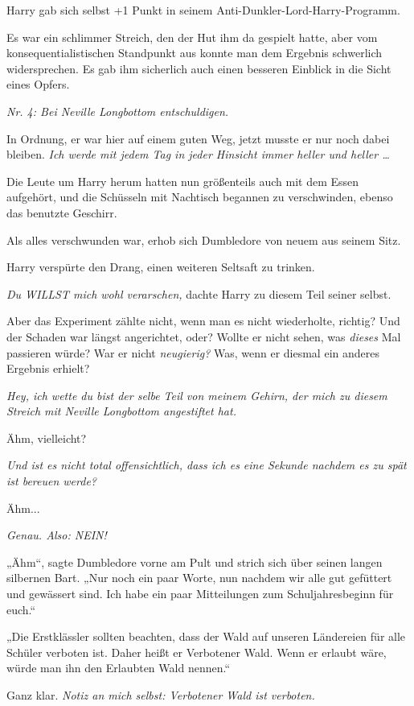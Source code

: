 {Harry gab sich selbst +1 Punkt in seinem Anti-Dunkler-Lord-Harry-Programm.

Es war ein schlimmer Streich, den der Hut ihm da gespielt hatte, aber vom konsequentialistischen Standpunkt aus konnte man dem Ergebnis schwerlich widersprechen. Es gab ihm sicherlich auch einen besseren Einblick in die Sicht eines Opfers.

\emph{Nr. 4: Bei Neville Longbottom entschuldigen.}

In Ordnung, er war hier auf einem guten Weg, jetzt musste er nur noch dabei bleiben. \emph{Ich werde mit jedem Tag in jeder Hinsicht immer heller und heller …}

Die Leute um Harry herum hatten nun größenteils auch mit dem Essen aufgehört, und die Schüsseln mit Nachtisch begannen zu verschwinden, ebenso das benutzte Geschirr.

Als alles verschwunden war, erhob sich Dumbledore von neuem aus seinem Sitz.

Harry verspürte den Drang, einen weiteren Seltsaft zu trinken.

\emph{Du WILLST mich wohl verarschen,} dachte Harry zu diesem Teil seiner selbst.

Aber das Experiment zählte nicht, wenn man es nicht wiederholte, richtig? Und der Schaden war längst angerichtet, oder? Wollte er nicht sehen, was \emph{dieses} Mal passieren würde? War er nicht \emph{neugierig?} Was, wenn er diesmal ein anderes Ergebnis erhielt?

\emph{Hey, ich wette du bist der selbe Teil von meinem Gehirn, der mich zu diesem Streich mit Neville Longbottom angestiftet hat.}

Ähm, vielleicht?

\emph{Und ist es nicht total offensichtlich, dass ich es eine Sekunde nachdem es zu spät ist bereuen werde?}

Ähm...

\emph{Genau. Also: NEIN!}

„Ähm“, sagte Dumbledore vorne am Pult und strich sich über seinen langen silbernen Bart. „Nur noch ein paar Worte, nun nachdem wir alle gut gefüttert und gewässert sind. Ich habe ein paar Mitteilungen zum Schuljahresbeginn für euch.“

„Die Erstklässler sollten beachten, dass der Wald auf unseren Ländereien für alle Schüler verboten ist. Daher heißt er Verbotener Wald. Wenn er erlaubt wäre, würde man ihn den Erlaubten Wald nennen.“

Ganz klar. \emph{Notiz an mich selbst: Verbotener Wald ist verboten.}

}
